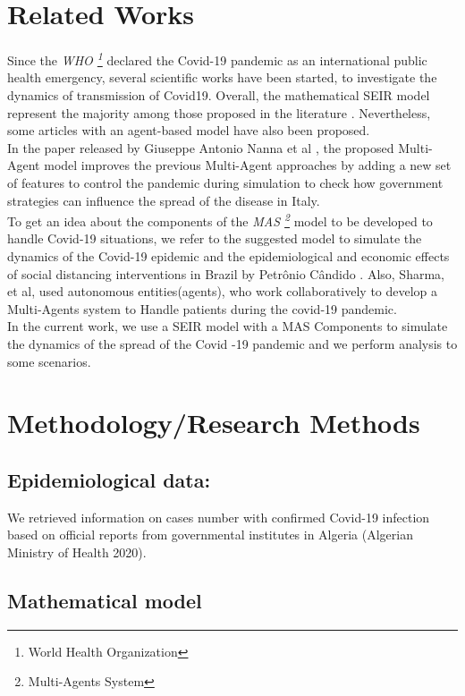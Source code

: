 \documentclass[paper=a4, fontsize=11.5pt]{scrartcl}
\numberwithin{equation}{section}		%
\numberwithin{figure}{section}			%
\numberwithin{table}{section}				%
\begin{document}
\section{Related Works}
\quad Since the  \emph{WHO \footnote{World Health Organization}} declared the Covid-19 pandemic as an international public health emergency, several scientific works have been started, to investigate the dynamics of transmission of Covid19. Overall, the mathematical SEIR model represent the majority among those proposed in the literature \cite {kamrujjaman2020pandemic}\cite {godio2020seir}\cite {sardar2004assessment}\cite {ullah2020modeling}. Nevertheless, some articles with an agent-based model have also been proposed.\\
\smallskip
\qquad In the paper released by Giuseppe Antonio Nanna et al \cite{nanna2020multi}, the proposed Multi-Agent model improves the previous Multi-Agent approaches by adding a new set of features to control the pandemic during simulation to check how government strategies can influence the spread of the disease in Italy.\\
\smallskip
\qquad To get an idea about the components of the\emph{ MAS \footnote{Multi-Agents  System}} model to be developed to handle Covid-19 situations, we refer to the suggested model to simulate the dynamics of the Covid-19 epidemic and the epidemiological and economic effects of social distancing interventions in Brazil by Petrônio Cândido \cite{silva2020covid}. Also, Sharma, et al, used autonomous entities(agents), who work collaboratively to develop a Multi‑Agents system to Handle patients during the covid‑19 pandemic\cite{sharma2020multi}.\\
\smallskip
\qquad In the current work, we use a SEIR model with a MAS Components to simulate the dynamics of the spread of the Covid -19 pandemic and we perform analysis to some scenarios.
\section{Methodology/Research Methods}
\subsection{Epidemiological data: }
\quad We retrieved information on cases number with confirmed Covid-19 infection based on official reports from governmental institutes in Algeria (Algerian Ministry of Health 2020)\cite{hamidouche2020covid}.

\subsection{Mathematical model }
\end{document}

